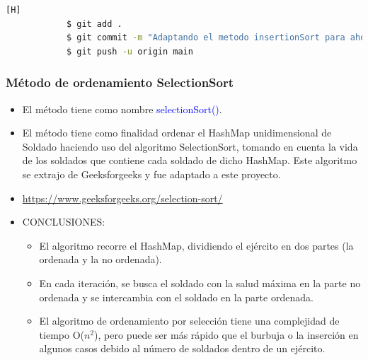 \documentclass{article}
\begin{document}
        

        \begin{lstlisting}[language=bash,caption={Commit \href{https://github.com/hernanchoquehuanca/fp2-23b/commit/e569a5fef9e70634058575c10446d584e7002e56}{e569a5f}: Se agregó el método que contiene el algoritmo de ordenamiento insertionSort, reutilizándola del laboratorio anterior y adaptándola a los nuevos ejércitos en HashMap}][H]
    		$ git add .
    		$ git commit -m "Adaptando el metodo insertionSort para ahora trabajar con HashMap, cambiando el parametro del mismo y adaptando el metodo para colocar valores dentro del HashMap"
    		$ git push -u origin main
    	\end{lstlisting}
\newpage

        \subsubsection{Método de ordenamiento SelectionSort}

        \begin{itemize}
            \item El método tiene como nombre \textcolor{blue}{selectionSort()}.
            \item El método tiene como finalidad ordenar el HashMap unidimensional de Soldado haciendo uso del algoritmo SelectionSort, tomando en cuenta la vida de los soldados que contiene cada soldado de dicho HashMap. Este algoritmo se extrajo de Geeksforgeeks y fue adaptado a este proyecto.
            \item \href{https://www.geeksforgeeks.org/selection-sort/}{https://www.geeksforgeeks.org/selection-sort/}
            \item CONCLUSIONES:
            \begin{itemize}
                \item El algoritmo recorre el HashMap, dividiendo el ejército en dos partes (la ordenada y la no ordenada).
                \item En cada iteración, se busca el soldado con la salud máxima en la parte no ordenada y se intercambia con el soldado en la parte ordenada.
                \item El algoritmo de ordenamiento por selección tiene una complejidad de tiempo O($n^2$), pero puede ser más rápido que el burbuja o la inserción en algunos casos debido al número de soldados dentro de un ejército.
            \end{itemize}
        \end{itemize}
\end{document}
